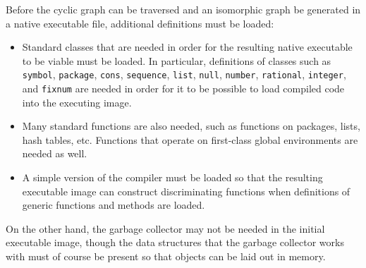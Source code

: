 Before the cyclic graph can be traversed and an isomorphic graph be
generated in a native executable file, additional definitions must be
loaded:

\begin{itemize}
\item Standard classes that are needed in order for the resulting
  native executable to be viable must be loaded.  In particular,
  definitions of classes such as \texttt{symbol}, \texttt{package},
  \texttt{cons}, \texttt{sequence}, \texttt{list}, \texttt{null},
  \texttt{number}, \texttt{rational}, \texttt{integer}, and
  \texttt{fixnum} are needed in order for it to be possible to load
  compiled code into the executing image.
\item Many standard functions are also needed, such as functions on
  packages, lists, hash tables, etc.  Functions that operate on
  first-class global environments are needed as well.
\item A simple version of the compiler must be loaded so that the
  resulting executable image can construct discriminating functions
  when definitions of generic functions and methods are loaded.
\end{itemize}

On the other hand, the garbage collector may not be needed in the
initial executable image, though the data structures that the garbage
collector works with must of course be present so that objects can be
laid out in memory.


